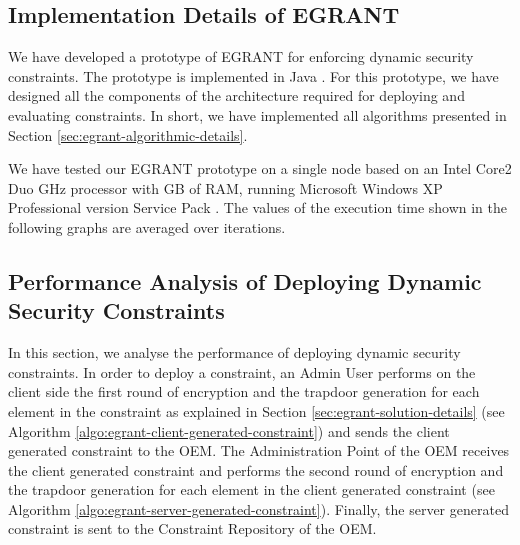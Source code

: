 \documentclass[epsfig,a4paper,11pt,titlepage]{book}
\numberwithin{algorithm}{chapter}
\begin{document}
\subsection[Implementation Details of E-GRANT]{Implementation Details of \gls{EGRANT}}
We have developed a prototype of \gls{EGRANT} for enforcing dynamic security constraints. The prototype is implemented in Java . For this prototype, we have designed all the components of the architecture required for deploying and evaluating constraints. In short, we have implemented all algorithms presented in Section \ref{sec:egrant-algorithmic-details}.

We have tested our \gls{EGRANT} prototype on a single node based on an Intel Core2 Duo  GHz processor with  GB of RAM, running Microsoft Windows XP Professional version  Service Pack . The values of the execution time shown in the following graphs are averaged over  iterations.

\subsection{Performance Analysis of Deploying Dynamic Security Constraints}
In this section, we analyse the performance of deploying dynamic security constraints. In order to deploy a constraint, an Admin User performs on the client side the first round of encryption and the trapdoor generation for each element in the constraint as explained in Section \ref{sec:egrant-solution-details} (see Algorithm \ref{algo:egrant-client-generated-constraint}) and sends the client generated constraint to the \gls{OEM}. The Administration Point of the \gls{OEM} receives the client generated constraint and performs the second round of encryption and the trapdoor generation for each element in the client generated constraint (see Algorithm \ref{algo:egrant-server-generated-constraint}). Finally, the server generated constraint is sent to the Constraint Repository of the \gls{OEM}.
\end{document}
